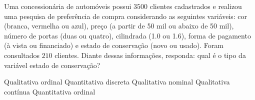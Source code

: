 Uma concessionária de automóveis possui $3500$ clientes cadastrados e realizou uma pesquisa de preferência de compra considerando as seguintes variáveis: cor (branca, vermelha ou azul), preço (a partir de 50 mil ou abaixo de 50 mil), número de portas (duas ou quatro), cilindrada (1.0 ou 1.6), forma de pagamento (à vista ou financiado) e estado de conservação (novo ou usado). Foram consultados $210$ clientes. Diante dessas informações, responda: qual é o tipo da variável estado de conservação?

Qualitativa ordinal
Quantitativa discreta
Qualitativa nominal
Qualitativa contínua
Quantitativa ordinal
